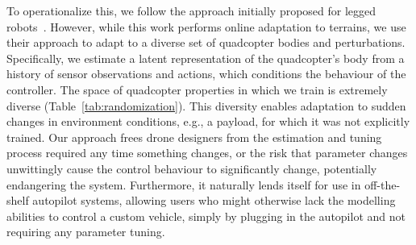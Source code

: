 To operationalize this, we follow the approach initially proposed for legged robots~\cite{kumar2021rma}. However, while this work performs online adaptation to terrains, we use their approach to adapt to a diverse set of quadcopter bodies and perturbations. Specifically, we estimate a latent representation of the quadcopter's body from a history of sensor observations and actions, which conditions the behaviour of the controller.
%
The space of quadcopter properties in which we train is extremely diverse (Table~\ref{tab:randomization}).
%
%
This diversity enables adaptation to sudden changes in environment conditions, e.g., a payload, for which it was not explicitly trained.
%
Our approach frees drone designers from the estimation and tuning process required any time something changes, or the risk that parameter changes unwittingly cause the control behaviour to significantly change, potentially endangering the system.
%
Furthermore, it naturally lends itself for use in off-the-shelf autopilot systems, allowing users who might otherwise lack the modelling abilities to control a custom vehicle, simply by plugging in the autopilot and not requiring any parameter tuning.



